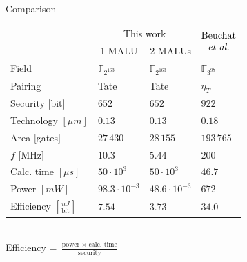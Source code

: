 \documentclass[svgnames]{beamer}
\begin{document}
\begin{frame}{Comparison}
\begin{center}
\small{\begin{tabular}{llll}
			\\[-1.5em] \toprule
			&	\multicolumn{2}{c}{This work}	& \multirow{2}{*}{$\begin{array}{@{}c@{}}\text{Beuchat}\\\text{\emph{et al.}}\end{array}$}\\
			\cmidrule(r){2-3}
			& \multicolumn{1}{c}{1 MALU} & \multicolumn{1}{c}{2 MALUs} &\\
	 		\midrule
			Field																& $\mathbb{F}_{2^{163}}$	& $\mathbb{F}_{2^{163}}$	& $\mathbb{F}_{3^{97}}$\\
			Pairing															& Tate							& Tate							& $\eta_T$\\
			Security $[$bit$]$											& $652$							& $652$							& $922$\\
			Technology $[\mu m]$											& $0.13$							& $0.13$							& $0.18$\\
			Area $[$gates$]$												& $27\,430$						& $28\,155$						& $193\,765$\\
			$f$ $[$MHz$]$													& $10.3$							& $5.44$							& $200$\\
			Calc. time $[\mu s]$											& $50 \cdot 10^3$				& $50 \cdot 10^3$				& $46.7$\\
			Power $[mW]$													& $98.3 \cdot 10^{-3}$		& $48.6 \cdot 10^{-3}$		& $672$\\
			Efficiency $\left[ \frac{nJ}{\text{bit}}\right]$	& $7.54$							& $3.73$							& $34.0$\\
			\bottomrule		
		\end{tabular}}
		
		\\[1.5em]
		
		Efficiency = $\frac{\text{power} \; \times \; \text{calc. time}}{\text{security}}$
\end{center}
\end{frame}
\end{document}
